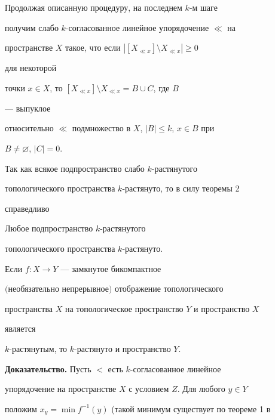 Продолжая описанную процедуру, на последнем $k$-м шаге  


получим слабо $k$-согласованное линейное упорядочение $\ll$ на  


пространстве $X$ такое, что если $|[X_{\ll x}]\setminus X_{\ll x}|\ge 0$ 


для некоторой  


точки $x\in X$, то $[X_{\ll x}]\setminus X_{\ll x}=B\cup C$, где $B$ 


--- выпуклое  


относительно $\ll$ подмножество в $X$, $|B|\le k$, $x\in B$ при 


$B\ne\varnothing$, $|C|=0$. 


 


Так как всякое подпространство слабо $k$-растянутого 


топологического пространства $k$-растянуто, то в силу теоремы 2  


справедливо 


 


\begin{cor} 


Любое подпространство $k$-растянутого 


топологического пространства $k$-рас\-тя\-нуто. 


\end{cor} 


 


\begin{thm} 


Если $f:X\to Y$ --- замкнутое бикомпактное  


$($необязательно непрерывное$)$ отображение топологического 


пространства $X$ на топологическое пространство $Y$ и пространство $X$ 


является 


$k$-растянутым, то $k$-растянуто и пространство $Y$. 


\end{thm} 


 


{\bf Доказательство.} Пусть $<$ есть $k$-согласованное линейное 


упорядочение на пространстве $X$ с условием $Z$. Для любого $y\in Y$ 


положим $x_y=\min f^{-1}(y)$ (такой минимум существует по теореме 1 в  


